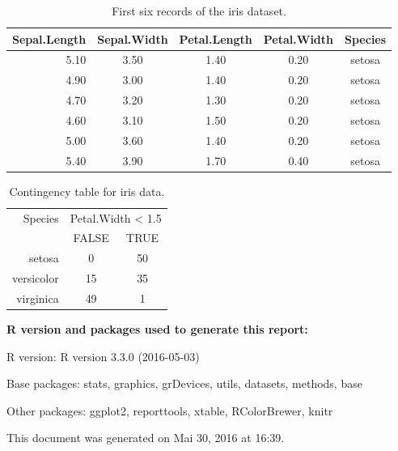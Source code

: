 \documentclass[11pt,a4paper,twoside]{article}\usepackage[]{graphicx}\usepackage[]{color}
\newcommand{\prog}[1]{\textsf{#1}}
\begin{document}
\begin{table}[!ht]
\centering
\begingroup\footnotesize
\begin{tabular}{rcccc}
  \hline
Sepal.Length & Sepal.Width & Petal.Length & Petal.Width & Species \\ 
  \hline
5.10 & 3.50 & 1.40 & 0.20 & setosa \\ 
  4.90 & 3.00 & 1.40 & 0.20 & setosa \\ 
  4.70 & 3.20 & 1.30 & 0.20 & setosa \\ 
  4.60 & 3.10 & 1.50 & 0.20 & setosa \\ 
  5.00 & 3.60 & 1.40 & 0.20 & setosa \\ 
  5.40 & 3.90 & 1.70 & 0.40 & setosa \\ 
   \hline
\end{tabular}
\endgroup
\caption{First six records of the iris dataset.} 
\label{tbl:head}
\end{table}
\begin{table}[!ht]
\centering
\begingroup\footnotesize
\begin{tabular}{r|cc}
  \hline Species & \multicolumn{2}{c}{Petal.Width < 1.5} \\ & FALSE & TRUE \\ 
  \hline
setosa &   0 &  50 \\ 
  versicolor &  15 &  35 \\ 
  virginica &  49 &   1 \\ 
   \hline
\end{tabular}
\endgroup
\caption{Contingency table for iris data.} 
\label{tbl:cont}
\end{table}


\nocite{R}




\vfill

\footnotesize

{\bf \prog{R} version and packages used to generate this report:}

\prog{R} version: \textsf{R version 3.3.0 (2016-05-03)}

Base packages: \textsf{stats, graphics, grDevices, utils, datasets, methods, base}

Other packages: \textsf{ggplot2, reporttools, xtable, RColorBrewer, knitr}

This document was generated on Mai 30, 2016 at 16:39.
\end{document}
